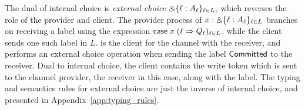The dual of internal choice is \emph{external choice} $\mathbin{\binampersand} \{ \ell :
A_\ell \}_{\ell \in L}$, which reverses the role of the provider and client.
The provider process of $x : \mathbin{\binampersand} \{ \ell : A_\ell \}_{\ell \in L}$ branches on receiving a label
using the expression $\mathsf{case} \; x \; (\ell \Rightarrow Q_\ell)_{\ell \in L}$,
while the client sends one such label in $L$.
\Fcom is the client for the channel with the receiver, and performs an external choice operation
when sending the label $\mathsf{Committed}$ to the receiver.
Dual to internal choice, the client \Fcom contains the write token which is
sent to the channel provider, the receiver in this case, along with the label.
The typing and semantics rules for external choice are just the inverse of internal choice,
and presented in Appendix~\ref{app:typing_rules}.


